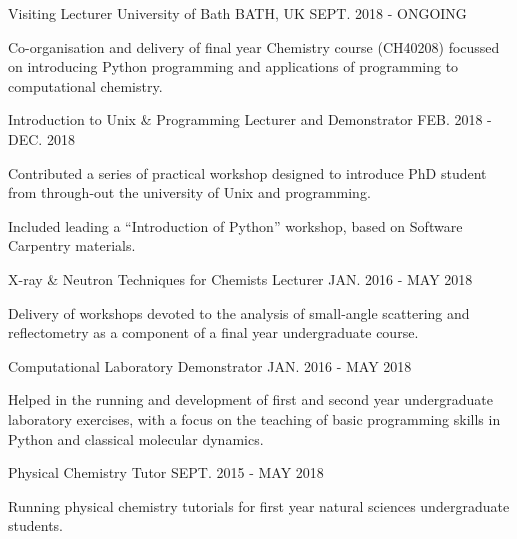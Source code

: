 \begin{cventries}
	\cventry
	{Visiting Lecturer}
	{University of Bath}
	{BATH, UK}
	{SEPT. 2018 - ONGOING}
	{
		\begin{cvitems}
			\item {Co-organisation and delivery of final year Chemistry course (CH40208) focussed on introducing Python programming and applications of programming to computational chemistry.}
		\end{cvitems}
	}
	\cventry
	{Introduction to Unix \& Programming Lecturer and Demonstrator}
	{}
	{}
	{FEB. 2018 - DEC. 2018}
	{
		\begin{cvitems}
			\item {Contributed a series of practical workshop designed to introduce PhD student from through-out the university of Unix and programming.}
			\item {Included leading a ``Introduction of Python'' workshop, based on Software Carpentry materials. }
		\end{cvitems}
	}
	\cventry
	{X-ray \& Neutron Techniques for Chemists Lecturer}
	{}
	{}
	{JAN. 2016 - MAY 2018}
	{
		\begin{cvitems}
			\item {Delivery of workshops devoted to the analysis of small-angle scattering and reflectometry as a component of a final year undergraduate course.}
		\end{cvitems}
	}
	\cventry
	{Computational Laboratory Demonstrator}
	{}
	{}
	{JAN. 2016 - MAY 2018}
	{
		\begin{cvitems}
			\item {Helped in the running and development of first and second year undergraduate laboratory exercises, with a focus on the teaching of basic programming skills in Python and classical molecular dynamics.}
		\end{cvitems}
	}
	\cventry
	{Physical Chemistry Tutor}
	{}
	{}
	{SEPT. 2015 - MAY 2018}
	{
		\begin{cvitems}
			\item {Running physical chemistry tutorials for first year natural sciences undergraduate students.}

\end{cvitems}}
\end{cventries}
